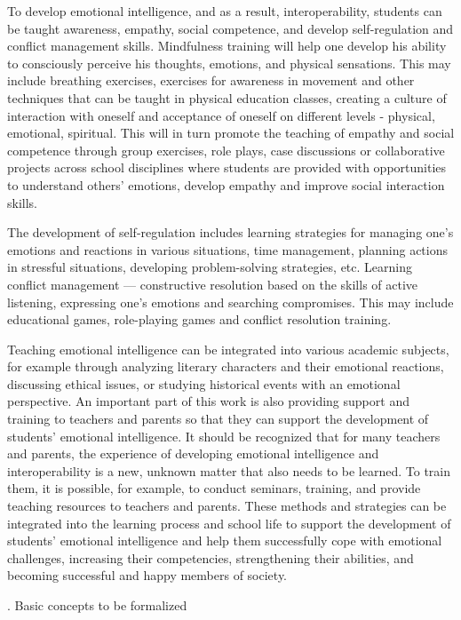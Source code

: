 \documentclass[10pt, a4paper]{article}
\begin{document}
\begin{multicols}{2}
        To develop emotional intelligence, and as a result, interoperability, students can be taught awareness, empathy, social competence, and develop self-regulation and conflict management skills. Mindfulness training will help one develop his ability to consciously perceive his thoughts, emotions, and physical sensations. This may include breathing exercises, exercises for awareness in movement and other techniques that can be taught in physical education classes, creating a culture of interaction with oneself and acceptance of oneself on different levels - physical, emotional, spiritual. This will in turn promote the teaching of empathy and social competence through group exercises, role plays, case discussions or collaborative projects across school disciplines where students are provided with opportunities to understand others’ emotions, develop empathy and improve social interaction skills.

        The development of self-regulation includes learning strategies for managing one’s emotions and reactions in various situations, time management, planning actions in stressful situations, developing problem-solving strategies, etc. Learning conflict management — constructive resolution based on the skills of active listening, expressing one’s emotions and searching compromises. This may include educational games, role-playing games and conflict resolution training.

        Teaching emotional intelligence can be integrated into various academic subjects, for example through analyzing literary characters and their emotional reactions, discussing ethical issues, or studying historical events with an emotional perspective. An important part of this work is also providing support and training to teachers and parents so that they can support the development of students’ emotional intelligence. It should be recognized that for many teachers and parents, the experience of developing emotional intelligence and interoperability is a new, unknown matter that also needs to be learned. To train them, it is possible, for example, to conduct seminars, training, and provide teaching resources to teachers and parents. These methods and strategies can be integrated into the learning process and school life to support the development of students’ emotional intelligence and help them successfully cope with emotional challenges, increasing their competencies, strengthening their abilities, and becoming successful and happy members of society.

        \begin{center}
            \MakeUppercase{}. Basic concepts to be formalized
        \end{center}


\end{multicols}
\end{document}
